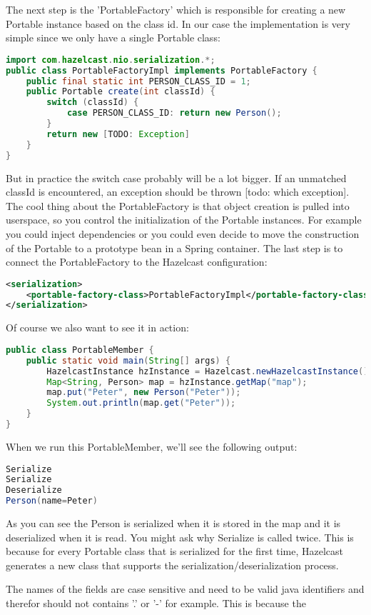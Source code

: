 The next step is the 'PortableFactory' which is responsible for creating a new Portable instance based on the class id. In our case the implementation is very simple since we only have a single Portable class:
\begin{lstlisting}[language=java]
import com.hazelcast.nio.serialization.*;
public class PortableFactoryImpl implements PortableFactory {
    public final static int PERSON_CLASS_ID = 1;
    public Portable create(int classId) {
        switch (classId) {
            case PERSON_CLASS_ID: return new Person();
        }
        return new [TODO: Exception]
    }
}
\end{lstlisting}
But in practice the switch case probably will be a lot bigger. If an unmatched classId is encountered, an exception should be thrown [todo: which exception]. The cool thing about the PortableFactory is that object creation is pulled into userspace, so you control the initialization of the Portable instances. For example you could inject dependencies or you could even decide to move the construction of the Portable to a prototype bean in a Spring container. The last step is to connect the PortableFactory to the Hazelcast configuration:
\begin{lstlisting}[language=xml]
<serialization>
    <portable-factory-class>PortableFactoryImpl</portable-factory-class>
</serialization>
\end{lstlisting}
Of course we also want to see it in action:
\begin{lstlisting}[language=java]
public class PortableMember {
    public static void main(String[] args) {
        HazelcastInstance hzInstance = Hazelcast.newHazelcastInstance();
        Map<String, Person> map = hzInstance.getMap("map");
        map.put("Peter", new Person("Peter"));
        System.out.println(map.get("Peter"));
    }
}
\end{lstlisting}
When we run this PortableMember, we'll see the following output:
\begin{lstlisting}[language=java]
Serialize
Serialize
Deserialize
Person(name=Peter)
\end{lstlisting}
As you can see the Person is serialized when it is stored in the map and it is deserialized when it is read. You might ask why Serialize is called twice. This is because for every Portable class that is serialized for the first time, Hazelcast generates a new class that supports the serialization/deserialization process. 

The names of the fields are case sensitive and need to be valid java identifiers and therefor should not contains '.' or '-' for example. This is because the 

